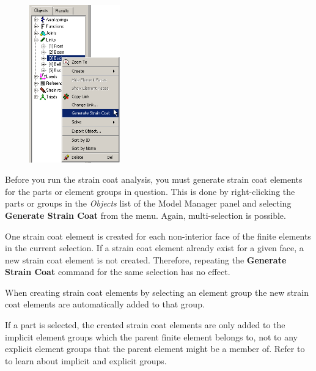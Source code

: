 {\clearpage



\begin{figure}
  \vspace{-5mm}
  \includegraphics[width=0.35\textwidth]{Figures/6-GenerateStraincoat}
\end{figure}

Before you run the strain coat analysis, you must generate strain coat elements
for the parts or element groups in question. This is done by right-clicking the
parts or groups in the {\sl Objects} list of the Model Manager panel
and selecting \textbf{Generate Strain Coat} from the menu.
Again, multi-selection is possible.

One strain coat element is created for each non-interior face of the finite
elements in the current selection. If a strain coat element already exist for a
given face, a new strain coat element is not created.
Therefore, repeating the \textbf{Generate Strain Coat} command for
the same selection has no effect.

When creating strain coat elements by selecting an element group the new
strain coat elements are automatically added to that group.

If a part is selected, the created strain coat elements are only added to the
implicit element groups which the parent finite element belongs to, not to any
explicit element groups that the parent element might be a member of.
Refer to 
to learn about implicit and explicit groups.



}
